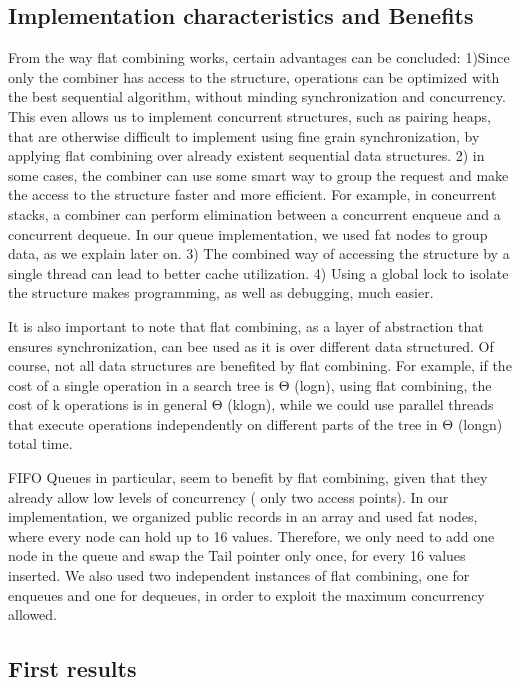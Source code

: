 \subsection{Implementation characteristics and Benefits}
From the way flat combining works, certain advantages can be concluded:
1)Since only the combiner has access to the structure, operations can be optimized with the best sequential algorithm, without minding synchronization and concurrency. This even allows us to implement concurrent structures, such as pairing heaps, that are otherwise difficult to implement using fine grain synchronization, by applying flat combining over already existent sequential data structures.
2) in some cases, the combiner can use some smart way to group the request and make the access to the structure faster and more efficient. For example, in concurrent stacks, a combiner can perform elimination between a concurrent enqueue and a concurrent dequeue. In our queue implementation, we used fat nodes to group data, as we explain later on.
3) The combined way of accessing the structure by a single thread can lead to better cache utilization.
4) Using a global lock to isolate the structure makes programming, as well as debugging, much easier.

It is also important to note that flat combining, as a layer of abstraction that ensures synchronization, can bee used as it is over different data structured. Of course, not all data structures are benefited by flat combining. For example, if the cost of a single operation in a search tree is \textgreek{Θ} (logn), using flat combining, the cost of k operations is in general \textgreek{Θ} (klogn), while we could  use parallel threads that execute operations independently on different parts of the tree in \textgreek{Θ} (longn) total time.

FIFO Queues in particular, seem to benefit by flat combining, given that they already allow low levels of concurrency ( only two access points). In our implementation, we organized public records in an array and used fat nodes, where every node can hold up to 16 values. Therefore, we only need to add one node in the queue and swap the Tail pointer only once, for every 16 values inserted. We also used two independent instances of flat combining, one for enqueues and one for dequeues, in order to exploit the maximum concurrency allowed.

\subsection{First results}
 
